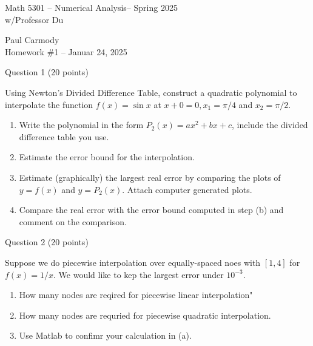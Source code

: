 \documentclass[10pt,a4paper]{report}
\newcommand{\CLASSNAME}{Math 5301 -- Numerical Analysis}
\newcommand{\STUDENTNAME}{Paul Carmody}
\newcommand{\ASSIGNMENT}{Homework \#1 }
\newcommand{\DUEDATE}{Januar 24, 2025}
\newcommand{\SEMESTER}{Spring 2025}
\begin{document}
\begin{center}
	\Large{\CLASSNAME -- \SEMESTER} \\
	\large{ w/Professor Du}
\end{center}
\begin{center}
	\STUDENTNAME \\
	\ASSIGNMENT -- \DUEDATE\\
\end{center} 

Question 1 (20 points)
\vspace{1 em}

Using Newton's Divided Difference Table, construct a quadratic polynomial to interpolate the function $f(x) = \sin x$ at $x+0=0, x_1=\pi/4$ and $x_2=\pi/2$.
\begin{enumerate}[label=(\alph*)]

	\item Write the polynomial in the form $P_2(x)=ax^2+bx+c$, include the divided difference table you use.
	\item Estimate the error bound for the interpolation.
	\item Estimate (graphically) the largest real error by comparing the plots of $y=f(x)$ and $y=P_2(x)$.  Attach computer generated plots.
	\item Compare the real error with the error bound computed in step (b) and comment on the comparison.

\end{enumerate}
\vspace{1 em}

Question 2 (20 points)
\vspace{1 em}

Suppose we do piecewise interpolation over equally-spaced noes with $[1,4]$ for $f(x)=1/x$.  We would like to kep the largest error under $10^{-3}$.

\begin{enumerate}[label=(\alph*]

	\item How many nodes are reqired for piecewise linear interpolation"
	
	\item How many nodes are requried for piecewise quadratic interpolation.
	
	\item Use Matlab to confimr your calculation in (a).

\end{enumerate}
\end{document}
